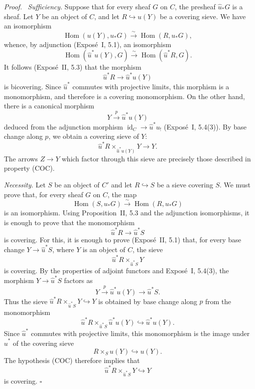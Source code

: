 \documentclass[11pt]{article}
\newcommand{\Hom}{\operatorname{Hom}}
\newcommand{\id}{\operatorname{id}}
\newcommand{\qedtext}{\hfill\(\square\)}
\newenvironment{prooftext}{\par\noindent\emph{Proof.}\ }{\par\medskip}
\begin{document}
\begin{prooftext}
\emph{Sufficiency.} Suppose that for every sheaf \(G\) on \(C\), the presheaf \(\widehat u_{\ast}G\) is a sheaf. Let \(Y\) be an object of \(C\), and let \(R\hookrightarrow u(Y)\) be a covering sieve. We have an isomorphism
\[
\Hom(u(Y),u_{\ast}G)\xrightarrow{\sim}\Hom(R,u_{\ast}G),
\]
whence, by adjunction (Expos\'e~I, 5.1), an isomorphism
\[
\Hom(\widehat u^{\ast}u(Y),G)\xrightarrow{\sim}\Hom(\widehat u^{\ast}R,G).
\]
It follows (Expos\'e~II, 5.3) that the morphism
\[
\widehat u^{\ast}R\to\widehat u^{\ast}u(Y)
\]
is bicov\-ering. Since \(\widehat u^{\ast}\) commutes with projective limits, this morphism is a monomorphism, and therefore is a covering monomorphism. On the other hand, there is a canonical morphism
\[
Y\xrightarrow{p}\widehat u^{\ast}u(Y)
\]
deduced from the adjunction morphism \(\id_C\to\widehat u^{\ast}u_!\) (Expos\'e~I, 5.4(3)). By base change along \(p\), we obtain a covering sieve of \(Y\):
\[
\widehat u^{\ast}R\times_{\widehat u^{\ast}u(Y)}Y\to Y.
\]
The arrows \(Z\to Y\) which factor through this sieve are precisely those described in property (COC).

\emph{Necessity.} Let \(S\) be an object of \(C'\) and let \(R\hookrightarrow S\) be a sieve covering \(S\). We must prove that, for every sheaf \(G\) on \(C\), the map
\[
\Hom(S,u_{\ast}G)\xrightarrow{\sim}\Hom(R,u_{\ast}G)
\]
is an isomorphism. Using Proposition~II, 5.3 and the adjunction isomorphisms, it is enough to prove that the monomorphism
\[
\widehat u^{\ast}R\to\widehat u^{\ast}S
\]
is covering. For this, it is enough to prove (Expos\'e~II, 5.1) that, for every base change \(Y\to\widehat u^{\ast}S\), where \(Y\) is an object of \(C\), the sieve
\[
\widehat u^{\ast}R\times_{\widehat u^{\ast}S}Y
\]
is covering. By the properties of adjoint functors and Expos\'e~I, 5.4(3), the morphism \(Y\to\widehat u^{\ast}S\) factors as
\[
Y\xrightarrow{p}\widehat u^{\ast}u(Y)\to\widehat u^{\ast}S.
\]
Thus the sieve \(\widehat u^{\ast}R\times_{\widehat u^{\ast}S}Y\hookrightarrow Y\) is obtained by base change along \(p\) from the monomorphism
\[
\widehat u^{\ast}R\times_{\widehat u^{\ast}S}\widehat u^{\ast}u(Y)\hookrightarrow \widehat u^{\ast}u(Y).
\]
Since \(\widehat u^{\ast}\) commutes with projective limits, this monomorphism is the image under \(\widehat u^{\ast}\) of the covering sieve
\[
R\times_Su(Y)\hookrightarrow u(Y).
\]
The hypothesis (COC) therefore implies that
\[
\widehat u^{\ast}R\times_{\widehat u^{\ast}S}Y\hookrightarrow Y
\]
is covering. \qedtext
\end{prooftext}
\end{document}
